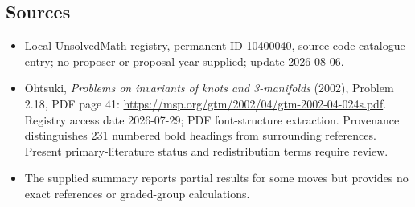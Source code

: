 \documentclass[11pt]{article}
\begin{document}
\subsection{Sources}
\begin{itemize}
\item Local UnsolvedMath registry, permanent ID 10400040, source code catalogue entry; no proposer or proposal year supplied; update 2026-08-06.
\item Ohtsuki, \emph{Problems on invariants of knots and 3-manifolds} (2002), Problem 2.18, PDF page 41: \url{https://msp.org/gtm/2002/04/gtm-2002-04-024s.pdf}. Registry access date 2026-07-29; PDF font-structure extraction. Provenance distinguishes 231 numbered bold headings from surrounding references. Present primary-literature status and redistribution terms require review.
\item The supplied summary reports partial results for some moves but provides no exact references or graded-group calculations.
\end{itemize}
\end{document}
